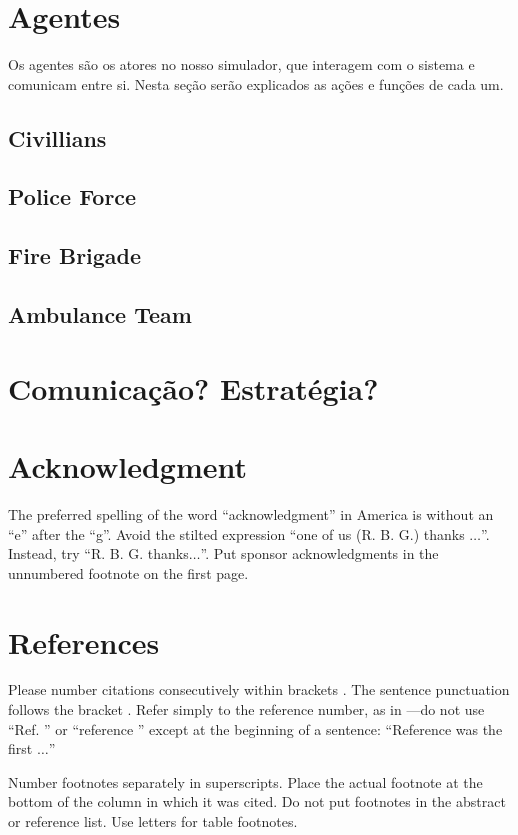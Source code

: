 \documentclass[conference]{IEEEtran}
\begin{document}
\section{Agentes}
Os agentes são os atores no nosso simulador, que interagem com o sistema e comunicam entre si. Nesta seção serão explicados as ações e funções de cada um.
\subsection{Civillians}
\subsection{Police Force}
\subsection{Fire Brigade}
\subsection{Ambulance Team}

\section{Comunicação? Estratégia?}

\section*{Acknowledgment}

The preferred spelling of the word ``acknowledgment'' in America is without 
an ``e'' after the ``g''. Avoid the stilted expression ``one of us (R. B. 
G.) thanks $\ldots$''. Instead, try ``R. B. G. thanks$\ldots$''. Put sponsor 
acknowledgments in the unnumbered footnote on the first page.

\section*{References}

Please number citations consecutively within brackets \cite{b1}. The 
sentence punctuation follows the bracket \cite{b2}. Refer simply to the reference 
number, as in \cite{b3}---do not use ``Ref. \cite{b3}'' or ``reference \cite{b3}'' except at 
the beginning of a sentence: ``Reference \cite{b3} was the first $\ldots$''

Number footnotes separately in superscripts. Place the actual footnote at 
the bottom of the column in which it was cited. Do not put footnotes in the 
abstract or reference list. Use letters for table footnotes.
\end{document}
